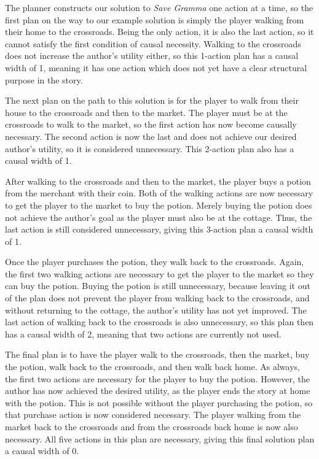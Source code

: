 \documentclass[letterpaper]{article} %
\begin{document}
The planner constructs our solution to \textit{Save Gramma} one action at a time, so the first plan on the way to our example solution is simply the player walking from their home to the crossroads. Being the only action, it is also the last action, so it cannot satisfy the first condition of causal necessity. Walking to the crossroads does not increase the author's utility either, so this 1-action plan has a causal width of 1, meaning it has one action which does not yet have a clear structural purpose in the story.

The next plan on the path to this solution is for the player to walk from their house to the crossroads and then to the market. The player must be at the crossroads to walk to the market, so the first action has now become causally necessary. The second action is now the last and does not achieve our desired author's utility, so it is considered unnecessary. This 2-action plan also has a causal width of 1.

After walking to the crossroads and then to the market, the player buys a potion from the merchant with their coin. Both of the walking actions are now necessary to get the player to the market to buy the potion. Merely buying the potion does not achieve the author's goal as the player must also be at the cottage. Thus, the last action is still considered unnecessary, giving this 3-action plan a causal width of 1.

Once the player purchases the potion, they walk back to the crossroads. Again, the first two walking actions are necessary to get the player to the market so they can buy the potion. Buying the potion is still unnecessary, because leaving it out of the plan does not prevent the player from walking back to the crossroads, and without returning to the cottage, the author's utility has not yet improved. The last action of walking back to the crossroads is also unnecessary, so this plan then has a causal width of 2, meaning that two actions are currently not used.

The final plan is to have the player walk to the crossroads, then the market, buy the potion, walk back to the crossroads, and then walk back home. As always, the first two actions are necessary for the player to buy the potion. However, the author has now achieved the desired utility, as the player ends the story at home with the potion. This is not possible without the player purchasing the potion, so that purchase action is now considered necessary. The player walking from the market back to the crossroads and from the crossroads back home is now also necessary. All five actions in this plan are necessary, giving this final solution plan a causal width of 0.
\end{document}

